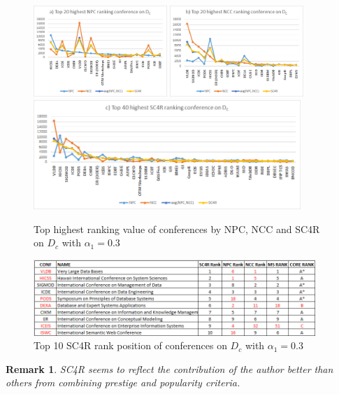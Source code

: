 \documentclass[10pt,leqno,twoside]{article}
\newtheorem{remark}{\indent Remark}[section]
\begin{document}
\begin{figure}
	\caption{Top highest ranking value of conferences by NPC, NCC and SC4R on $D_c$ with $\alpha_1=0.3$}
	\label{Fig:Top20ConfDc}
    \centering
    \includegraphics[width=0.45\textwidth]{Dct20NPCc}
    \includegraphics[width=0.45\textwidth]{Dct20NCCc}
    \includegraphics[width=0.90\textwidth]{Dct40SC4Rc}
\end{figure}
%
\begin{figure}
	\caption{Top 10 SC4R rank position of conferences on $D_c$ with $\alpha_1=0.3$}
	\label{Fig:Top10ConfDc}
    \centering
    \includegraphics[width=0.95\textwidth]{Top10Conf}
\end{figure}
%
\begin{remark}
SC4R seems to reflect the contribution of the author better than others from combining prestige and popularity criteria.
\end{remark}
\end{document}
